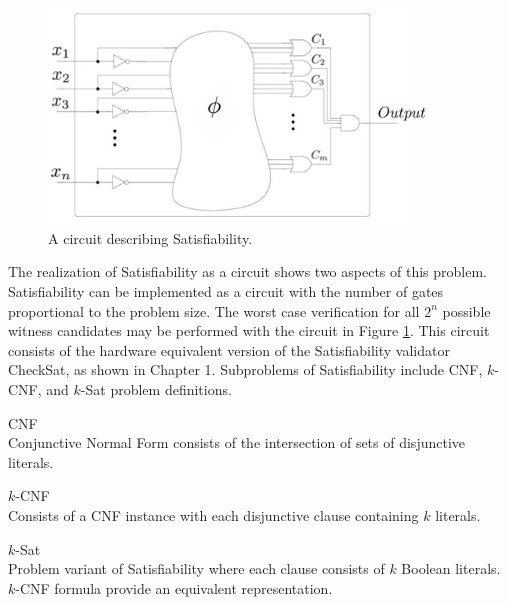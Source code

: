 \begin{figure}[htbp]
\begin{center}

	\includegraphics[width=0.9\textwidth]{figures/circuitLabeled.jpg}

\caption{A circuit describing {\sc Satisfiability}.}
\label{blackBoxSat}
\end{center}
\end{figure}
	
\FloatBarrier

The realization of {\sc Satisfiability} as a circuit shows two aspects of this problem.  {\sc Satisfiability} can be implemented as a circuit with the number of gates proportional to the problem size.  The worst case verification for all $2^n$ possible witness candidates may be performed with the circuit in Figure \ref{blackBoxSat}.  This circuit consists of the hardware equivalent version of the {\sc Satisfiability} validator {\sc CheckSat}, as shown in Chapter 1.  Subproblems of {\sc Satisfiability} include CNF, $k$-CNF, and $k$-{\sc Sat} problem definitions.

\begin{definition}
CNF\\
Conjunctive Normal Form consists of the intersection of sets of disjunctive literals. 
\end{definition}

\begin{definition}
$k$-CNF\\
Consists of a CNF instance with each disjunctive clause containing $k$ literals.
\end{definition}

\begin{definition}
$k$-{\sc Sat}\\
Problem variant of {\sc Satisfiability} where each clause consists of $k$ Boolean literals.  $k$-CNF formula provide an equivalent representation.
\end{definition}
	
